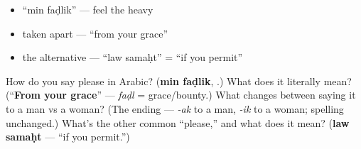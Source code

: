 \begin{itemize}
\raggedright
  \item \textquotedblleft{}min faḍlik\textquotedblright{} — feel the heavy 
  \item taken apart — \textquotedblleft{}from your grace\textquotedblright{}
  \item the alternative — \textquotedblleft{}law samaḥt\textquotedblright{} = \textquotedblleft{}if you permit\textquotedblright{}
\end{itemize}

\begin{tcolorbox}[breakable,colback=teal!4,colframe=teal!35!black,title={Before you move on}]
How do you say please in Arabic? (\textbf{min faḍlik},  .) What does it literally mean? (\textquotedblleft{}\textbf{From your grace}\textquotedblright{} — \emph{faḍl} = grace/bounty.) What changes between saying it to a man vs a woman? (The  ending — \emph{-ak} to a man, \emph{-ik} to a woman; spelling unchanged.) What's the other common \textquotedblleft{}please,\textquotedblright{} and what does it mean? (\textbf{law samaḥt} — \textquotedblleft{}if you permit.\textquotedblright{})
\end{tcolorbox}
